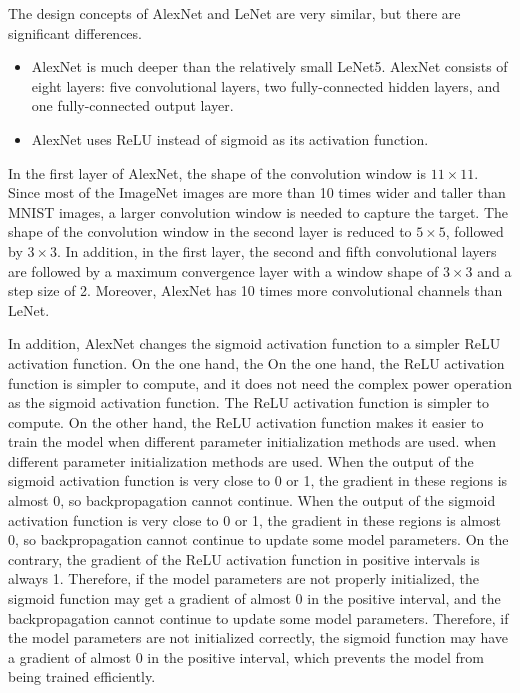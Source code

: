 \documentclass[a4paper,12pt]{article}
\begin{document}
The design concepts of AlexNet and LeNet are very similar, but there are significant differences.
\begin{itemize}
    \item AlexNet is much deeper than the relatively small LeNet5. AlexNet consists of eight layers: five convolutional layers,
two fully-connected hidden layers, and one fully-connected output layer.

    \item AlexNet uses ReLU instead of sigmoid as its activation function.
\end{itemize}

In the first layer of AlexNet, the shape of the convolution window is $11 \times 11$. Since most of the ImageNet
images are more than 10 times wider and taller than MNIST images, a larger convolution window is needed to
capture the target. The shape of the convolution window in the second layer is reduced to $5 \times 5$, followed by $3 \times 3$. In addition, in the first
layer, the second and fifth convolutional layers are followed by a maximum convergence layer with a window shape of $3 \times 3$ and a step size of 2.
Moreover, AlexNet has 10 times more convolutional channels than LeNet.

In addition, AlexNet changes the sigmoid activation function to a simpler ReLU activation function. On the one hand, the
On the one hand, the ReLU activation function is simpler to compute, and it does not need the complex power operation as the sigmoid activation function.
The ReLU activation function is simpler to compute. On the other hand, the ReLU activation function makes it easier to train the model when different parameter initialization methods are used.
when different parameter initialization methods are used. When the output of the sigmoid activation function is very close to 0 or 1, the gradient in these regions is almost 0, so backpropagation cannot continue.
When the output of the sigmoid activation function is very close to 0 or 1, the gradient in these regions is almost 0, so backpropagation cannot continue to update some model parameters. On the contrary, the gradient of the ReLU activation function in positive intervals is always 1.
Therefore, if the model parameters are not properly initialized, the sigmoid function may get a gradient of almost 0 in the positive interval, and the backpropagation cannot continue to update some model parameters.
Therefore, if the model parameters are not initialized correctly, the sigmoid function may have a gradient of almost 0 in the positive interval, which prevents the model from being trained efficiently.
\end{document}
